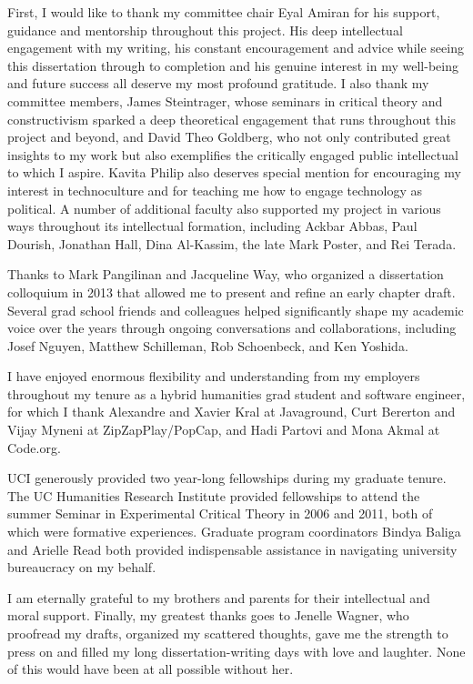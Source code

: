 First, I would like to thank my committee chair Eyal Amiran for his support, guidance and mentorship throughout this project. His deep intellectual engagement with my writing, his constant encouragement and advice while seeing this dissertation through to completion and his genuine interest in my well-being and future success all deserve my most profound gratitude. I also thank my committee members, James Steintrager, whose seminars in critical theory and constructivism sparked a deep theoretical engagement that runs throughout this project and beyond, and David Theo Goldberg, who not only contributed great insights to my work but also exemplifies the critically engaged public intellectual to which I aspire. Kavita Philip also deserves special mention for encouraging my interest in technoculture and for teaching me how to engage technology as political. A number of additional faculty also supported my project in various ways throughout its intellectual formation, including Ackbar Abbas, Paul Dourish, Jonathan Hall, Dina Al-Kassim, the late Mark Poster, and Rei Terada.

Thanks to Mark Pangilinan and Jacqueline Way, who organized a dissertation colloquium in 2013 that allowed me to present and refine an early chapter draft. Several grad school friends and colleagues helped significantly shape my academic voice over the years through ongoing conversations and collaborations, including Josef Nguyen, Matthew Schilleman, Rob Schoenbeck, and Ken Yoshida.

I have enjoyed enormous flexibility and understanding from my employers throughout my tenure as a hybrid humanities grad student and software engineer, for which I thank Alexandre and Xavier Kral at Javaground, Curt Bererton and Vijay Myneni at ZipZapPlay/PopCap, and Hadi Partovi and Mona Akmal at Code.org. 

UCI generously provided two year-long fellowships during my graduate tenure. The UC Humanities Research Institute provided fellowships to attend the summer Seminar in Experimental Critical Theory in 2006 and 2011, both of which were formative experiences. Graduate program coordinators Bindya Baliga and Arielle Read both provided indispensable assistance in navigating university bureaucracy on my behalf.

I am eternally grateful to my brothers and parents for their intellectual and moral support. Finally, my greatest thanks goes to Jenelle Wagner, who proofread my drafts, organized my scattered thoughts, gave me the strength to press on and filled my long dissertation-writing days with love and laughter. None of this would have been at all possible without her.